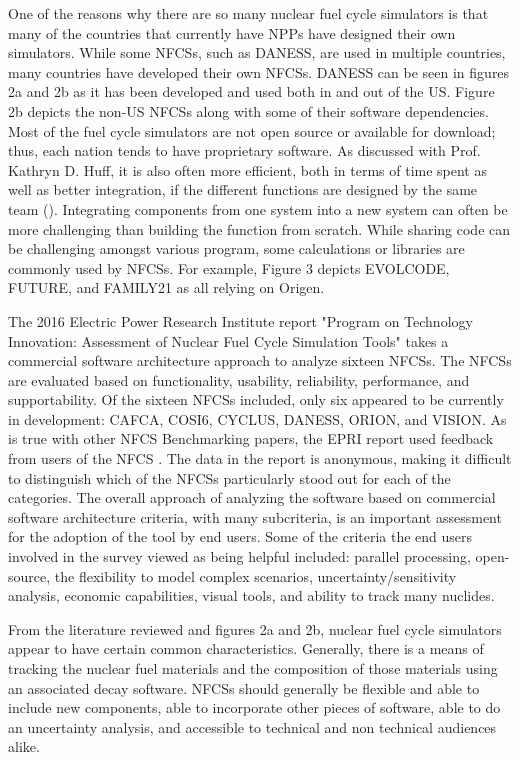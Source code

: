 \documentclass{article}                                                                           %
\begin{document}
\begin{linenumbers}
One of the reasons why there are so many nuclear fuel cycle simulators is that many of the countries that currently have NPPs have designed their own simulators. While some NFCSs, such as DANESS, are used in multiple countries, many countries have developed their own NFCSs.  DANESS can be seen in figures 2a and 2b as it has been developed and used both in and out of the US. Figure 2b depicts the non-US NFCSs along with some of their software dependencies. Most of the fuel cycle simulators are not open source or available for download; thus, each nation tends to have proprietary software. As discussed with Prof. Kathryn D. Huff, it is also often more efficient, both in terms of time spent as well as better integration, if the different functions are designed by the same team (\cite{redfoot_huff_2016}). Integrating components from one system into a new system can often be more challenging than building the function from scratch. While sharing code can be challenging amongst various program, some calculations or libraries are commonly used by NFCSs. For example, Figure 3 depicts EVOLCODE, FUTURE, and FAMILY21 as all relying on Origen.

The 2016 Electric Power Research Institute report "Program on Technology Innovation: Assessment of Nuclear Fuel Cycle Simulation Tools" takes a commercial software architecture approach to analyze sixteen NFCSs.  The NFCSs are evaluated based on functionality, usability, reliability, performance, and supportability. Of the sixteen NFCSs included, only six appeared to be currently in development: CAFCA, COSI6, CYCLUS, DANESS, ORION, and VISION. As is true with other NFCS Benchmarking papers, the EPRI report used feedback from users of the NFCS \cite{EPRI2016}.  The data in the report is anonymous, making it difficult to distinguish which of the NFCSs particularly stood out for each of the categories. The overall approach of analyzing the software based on commercial software architecture criteria, with many subcriteria, is an important assessment for the adoption of the tool by end users. Some of the criteria the end users involved in the survey viewed as being helpful included: parallel processing, open-source, the flexibility to model complex scenarios, uncertainty/sensitivity analysis, economic capabilities, visual tools, and ability to track many nuclides.

From the literature reviewed and figures 2a and 2b, nuclear fuel cycle simulators appear to have certain common characteristics. Generally, there is a means of tracking the nuclear fuel materials and the composition of those materials using an associated decay software. NFCSs should generally be flexible and able to include new components, able to incorporate other pieces of software, able to do an uncertainty analysis, and accessible to technical and non technical audiences alike.


\end{linenumbers}
\end{document}
